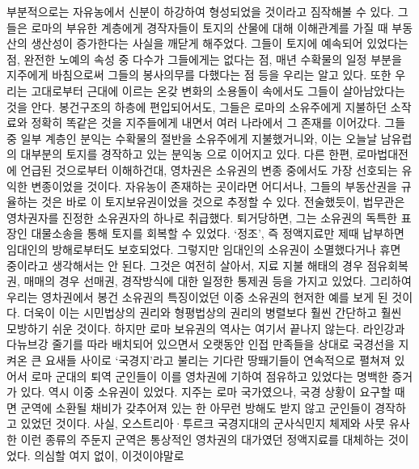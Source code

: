 부분적으로는 자유농에서 신분이 하강하여
형성되었을 것이라고 짐작해볼 수 있다.
그들은 로마의 부유한 계층에게
경작자들이 토지의 산물에 대해 이해관계를 가질 때
부동산의 생산성이 증가한다는 사실을
깨닫게 해주었다.
그들이 토지에 예속되어 있었다는 점,
완전한 노예의 속성 중 다수가 그들에게는 없다는 점,
매년 수확물의 일정 부분을 지주에게 바침으로써 그들의 봉사의무를
다했다는 점 등을
우리는 알고 있다.
또한 우리는 고대로부터 근대에 이르는 온갖 변화의 소용돌이 속에서도
그들이 살아남았다는 것을 안다.
봉건구조의 하층에 편입되어서도,
그들은 로마의 소유주에게 지불하던 소작료와 정확히
똑같은 것을 지주들에게 내면서 여러 나라에서 그 존재를 이어갔다.
그들 중 일부 계층인
분익는
수확물의 절반을 소유주에게 지불했거니와,
이는
오늘날 남유럽의 대부분의 토지를 경작하고 있는
분익농 으로 이어지고 있다.
다른 한편,
로마법대전에 언급된 것으로부터 이해하건대,
영차권은
소유권의 변종 중에서도
가장 선호되는 유익한 변종이었을 것이다.
자유농이 존재하는 곳이라면 어디서나,
그들의 부동산권을 규율하는 것은 바로 이 토지보유권이었을 것으로 추정할 수 있다.
전술했듯이, 법무관은 영차권자를
진정한 소유권자의 하나로 취급했다.
퇴거당하면, 그는
소유권의 독특한 표장인
대물소송을 통해 토지를 회복할 수 있었다.
`정조',
즉 정액지료만
제때 납부하면 임대인의 방해로부터도 보호되었다.
그렇지만 임대인의 소유권이
소멸했다거나 휴면 중이라고 생각해서는 안 된다.
그것은 여전히 살아서,
지료 지불 해태의 경우 점유회복권,
매매의 경우 선매권,
경작방식에 대한 일정한 통제권 등을 가지고 있었다.
그리하여 우리는 영차권에서
봉건 소유권의 특징이었던
이중 소유권의 현저한 예를 보게 된 것이다.
더욱이 이는
시민법상의 권리와 형평법상의 권리의 병렬보다
훨씬 간단하고 훨씬 모방하기 쉬운 것이다.
하지만 로마 보유권의 역사는 여기서 끝나지 않는다.
라인강과 다뉴브강 줄기를 따라
배치되어 있으면서
오랫동안
인접 만족들을 상대로
국경선을 지켜온
큰 요새들 사이로
`국경지'라고 불리는
기다란 땅뙈기들이
연속적으로 펼쳐져 있어서
로마 군대의 퇴역 군인들이 이를 영차권에 기하여
점유하고 있었다는
명백한 증거가 있다.
역시 이중 소유권이 있었다.
지주는 로마 국가였으나,
국경 상황이 요구할 때면 군역에 소환될 채비가 갖추어져 있는 한
아무런 방해도 받지 않고
군인들이
경작하고 있었던 것이다.
사실,
오스트리아^^b7투르크 국경지대의 군사식민지 체제와 사뭇 유사한
이런 종류의 주둔지 군역은
통상적인 영차권의 대가였던 정액지료를 대체하는 것이었다.
의심할 여지 없이,
이것이야말로
